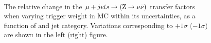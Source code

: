 \begin{figure}[!h]
  \centering
   ~~
  \\

  \caption{\label{fig:tfSyst_trigger_muToZinv} The relative change in
  the $\mu + jets \rightarrow ({\text Z} \rightarrow \nu\bar{\nu})$ transfer
  factors when varying trigger weight in MC within its uncertainties, as a function of \scalht and jet category. 
  Variations corresponding to $+1\sigma$ ($-1\sigma$) are shown in the left (right) figure. 
  }
\end{figure}
